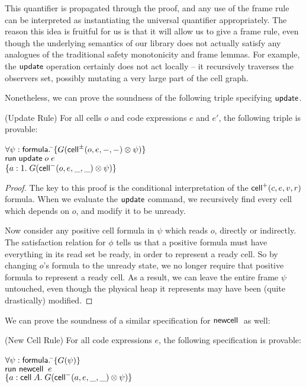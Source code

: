 \documentclass[preprint,natbib]{sigplanconf}
\begin{document}
This quantifier is propagated through the proof, and any use of the
frame rule can be interpreted as instantiating the universal
quantifier appropriately. The reason this idea is fruitful for us is
that it will allow us to give a frame rule, even though the underlying
semantics of our library does not actually satisfy any analogues of
the traditional safety monotonicity and frame lemmas. For example, the
$\mbox{\textsf{{update}}}$ operation certainly does not act locally -- it
recursively traverses the observers set, possibly mutating a very
large part of the cell graph.

Nonetheless, we can prove the soundness of the following triple
specifying $\mbox{\textsf{{update}}}$.

\begin{prop}{(Update Rule)}
For all cells $o$ and code expressions $e$ and $e'$, the following
triple is provable: 

\begin{tabbing}
$\forall \psi:\mbox{\textsf{{formula}}}.\; $\=$\{{G(\mbox{\textsf{{cell}}}^{\pm}({o}, {e}, {-}, {-}) \otimes \psi)}\}$ \\
                           \>$\mbox{\textsf{{run}}}\; {\mbox{\textsf{{update}}}\;o\;e}$ \\
                           \>$\{{a:1.\; G(\mbox{\textsf{{cell}}}^{-}({o}, {e}, {\_}, {\_}) \otimes \psi)}\}$
\end{tabbing}
\end{prop}

\begin{proof}
The key to this proof is the conditional interpretation of the
$\mbox{\textsf{{cell}}}^{+}({c}, {e}, {v}, {r})$ formula. When we evaluate the $\mbox{\textsf{{update}}}$
command, we recursively find every cell which depends on $o$, and
modify it to be unready.

Now consider any positive cell formula in $\psi$ which reads $o$,
directly or indirectly. The satisfaction relation for $\phi$ tells us
that a positive formula must have everything in its read set be
ready, in order to represent a ready cell. So by changing $o$'s
formula to the unready state, we no longer require that positive
formula to represent a ready cell. As a result, we can leave the
entire frame $\psi$ untouched, even though the physical heap it
represents may have been (quite drastically) modified. 
\end{proof}

We can prove the soundness of a similar specification for $\mbox{\textsf{{newcell}}}\;$ as
well:

\begin{prop}{(New Cell Rule)}
For all code expressions $e$, the following specification is provable: 
\begin{tabbing}
$\forall \psi:\mbox{\textsf{{formula}}}.\; $\=$\{{G(\psi)}\}$ \\
                           \>$\mbox{\textsf{{run }}}{\mbox{\textsf{{newcell}}}\;\;e}$ \\
                           \>$\{{a:\mbox{\textsf{{cell}}}\;{A}.\; G(\mbox{\textsf{{cell}}}^{-}({a}, {e}, {\_}, {\_}) \otimes \psi)}\}$
\end{tabbing}
\end{prop}
\end{document}
